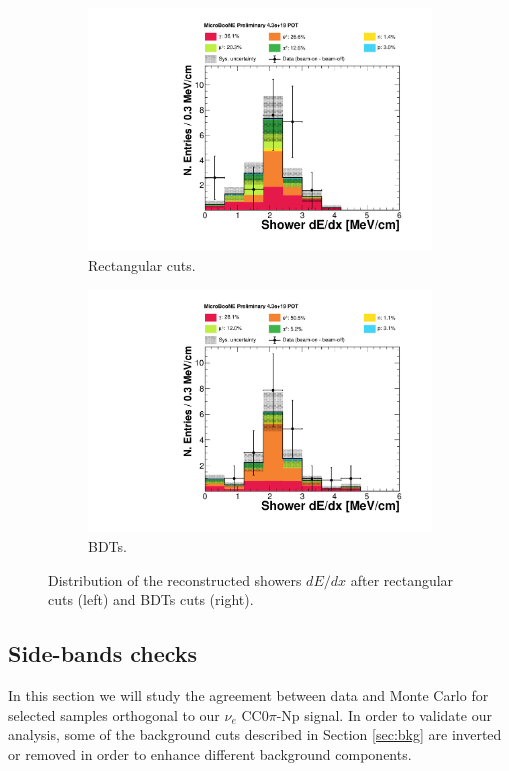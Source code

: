\begin{figure}[htbp]
\centering
  \begin{subfigure}{0.48\textwidth}
    \includegraphics[width=\linewidth]{figures/dedx_cuts.pdf}
    \caption{Rectangular cuts.} 
  \end{subfigure}
    \begin{subfigure}{0.48\textwidth}
    \includegraphics[width=\linewidth]{figures/dedx_bdt.pdf}
    \caption{BDTs.} 
  \end{subfigure}
  \caption{Distribution of the reconstructed showers $dE/dx$ after rectangular cuts (left) and BDTs cuts (right).}
  \label{fig:dedx_after}
\end{figure}

\subsection{Side-bands checks}
In this section we will study the agreement between data and Monte Carlo for selected samples orthogonal to our $\nu_{e}$ CC0$\pi$-Np signal. In order to validate our analysis, some of the background cuts described in Section \ref{sec:bkg} are inverted or removed in order to enhance different background components.
